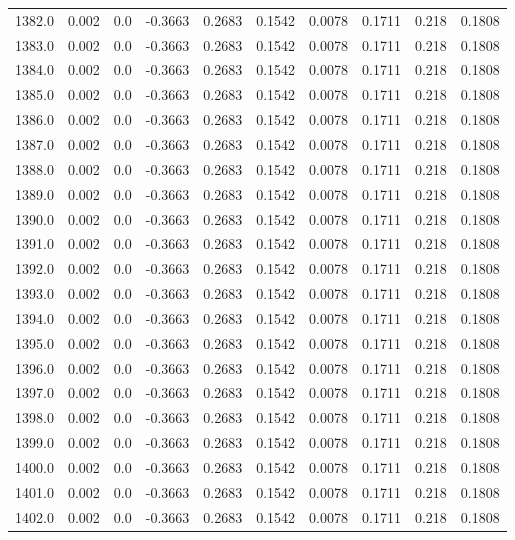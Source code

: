 \begin{longtable}{lrrrrrrrrr}
1382.0 & 0.002 & 0.0 & -0.3663 & 0.2683 & 0.1542 & 0.0078 & 0.1711 & 0.218 & 0.1808 \\
1383.0 & 0.002 & 0.0 & -0.3663 & 0.2683 & 0.1542 & 0.0078 & 0.1711 & 0.218 & 0.1808 \\
1384.0 & 0.002 & 0.0 & -0.3663 & 0.2683 & 0.1542 & 0.0078 & 0.1711 & 0.218 & 0.1808 \\
1385.0 & 0.002 & 0.0 & -0.3663 & 0.2683 & 0.1542 & 0.0078 & 0.1711 & 0.218 & 0.1808 \\
1386.0 & 0.002 & 0.0 & -0.3663 & 0.2683 & 0.1542 & 0.0078 & 0.1711 & 0.218 & 0.1808 \\
1387.0 & 0.002 & 0.0 & -0.3663 & 0.2683 & 0.1542 & 0.0078 & 0.1711 & 0.218 & 0.1808 \\
1388.0 & 0.002 & 0.0 & -0.3663 & 0.2683 & 0.1542 & 0.0078 & 0.1711 & 0.218 & 0.1808 \\
1389.0 & 0.002 & 0.0 & -0.3663 & 0.2683 & 0.1542 & 0.0078 & 0.1711 & 0.218 & 0.1808 \\
1390.0 & 0.002 & 0.0 & -0.3663 & 0.2683 & 0.1542 & 0.0078 & 0.1711 & 0.218 & 0.1808 \\
1391.0 & 0.002 & 0.0 & -0.3663 & 0.2683 & 0.1542 & 0.0078 & 0.1711 & 0.218 & 0.1808 \\
1392.0 & 0.002 & 0.0 & -0.3663 & 0.2683 & 0.1542 & 0.0078 & 0.1711 & 0.218 & 0.1808 \\
1393.0 & 0.002 & 0.0 & -0.3663 & 0.2683 & 0.1542 & 0.0078 & 0.1711 & 0.218 & 0.1808 \\
1394.0 & 0.002 & 0.0 & -0.3663 & 0.2683 & 0.1542 & 0.0078 & 0.1711 & 0.218 & 0.1808 \\
1395.0 & 0.002 & 0.0 & -0.3663 & 0.2683 & 0.1542 & 0.0078 & 0.1711 & 0.218 & 0.1808 \\
1396.0 & 0.002 & 0.0 & -0.3663 & 0.2683 & 0.1542 & 0.0078 & 0.1711 & 0.218 & 0.1808 \\
1397.0 & 0.002 & 0.0 & -0.3663 & 0.2683 & 0.1542 & 0.0078 & 0.1711 & 0.218 & 0.1808 \\
1398.0 & 0.002 & 0.0 & -0.3663 & 0.2683 & 0.1542 & 0.0078 & 0.1711 & 0.218 & 0.1808 \\
1399.0 & 0.002 & 0.0 & -0.3663 & 0.2683 & 0.1542 & 0.0078 & 0.1711 & 0.218 & 0.1808 \\
1400.0 & 0.002 & 0.0 & -0.3663 & 0.2683 & 0.1542 & 0.0078 & 0.1711 & 0.218 & 0.1808 \\
1401.0 & 0.002 & 0.0 & -0.3663 & 0.2683 & 0.1542 & 0.0078 & 0.1711 & 0.218 & 0.1808 \\
1402.0 & 0.002 & 0.0 & -0.3663 & 0.2683 & 0.1542 & 0.0078 & 0.1711 & 0.218 & 0.1808 \\

\end{longtable}
